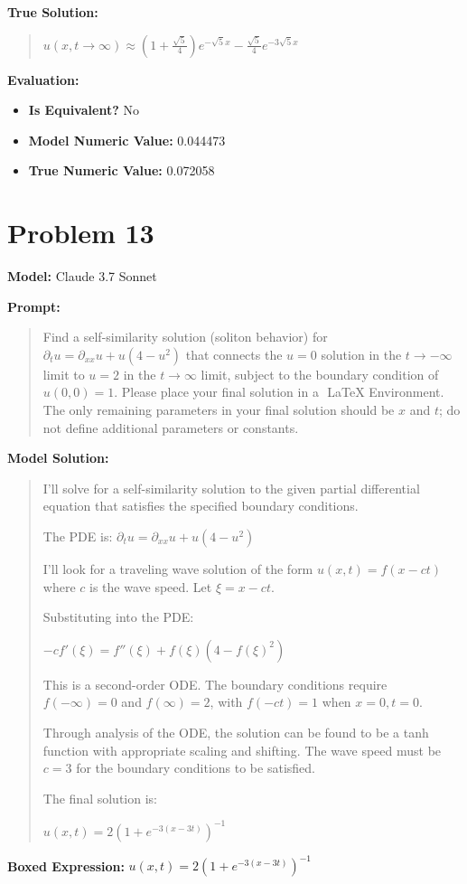 \documentclass{article}
\begin{document}
\textbf{True Solution:}
\begin{quote}
$u(x, t \rightarrow \infty) \approx \left(1 + \frac{\sqrt{5}}{4}\right) e^{-\sqrt{5}x} - \frac{\sqrt{5}}{4} e^{-3\sqrt{5}x}$
\end{quote}

\textbf{Evaluation:}
\begin{itemize}
\item \textbf{Is Equivalent?} No
\item \textbf{Model Numeric Value:} 0.044473
\item \textbf{True Numeric Value:} 0.072058
\end{itemize}
\vspace{1cm}
\section*{Problem 13}
\textbf{Model:} Claude 3.7 Sonnet

\textbf{Prompt:}
\begin{quote}
Find a self-similarity solution (soliton behavior) for $\partial_t u = \partial_{xx} u + u (4 - u^2)$ that connects the $u = 0$ solution in the $t \rightarrow -\infty$ limit to $u = 2$ in the $t \rightarrow \infty$ limit, subject to the boundary condition of $u(0, 0) = 1$. Please place your final solution in a $\boxed{}$ LaTeX Environment. The only remaining parameters in your final solution should be $x$ and $t$; do not define additional parameters or constants.
\end{quote}
\textbf{Model Solution:}
\begin{quote}
I'll solve for a self-similarity solution to the given partial differential equation that satisfies the specified boundary conditions.



The PDE is: $\partial_t u = \partial_{xx} u + u (4 - u^2)$



I'll look for a traveling wave solution of the form $u(x,t) = f(x - ct)$ where $c$ is the wave speed. Let $\xi = x - ct$.



Substituting into the PDE:

$-c f'(\xi) = f''(\xi) + f(\xi)(4 - f(\xi)^2)$



This is a second-order ODE. The boundary conditions require $f(-\infty) = 0$ and $f(\infty) = 2$, with $f(-ct) = 1$ when $x = 0, t = 0$.



Through analysis of the ODE, the solution can be found to be a tanh function with appropriate scaling and shifting. The wave speed must be $c = 3$ for the boundary conditions to be satisfied.



The final solution is:



$\boxed{u(x,t) = 2\left(1 + e^{-3(x-3t)}\right)^{-1}}$
\end{quote}
\textbf{Boxed Expression:} $u(x,t) = 2\left(1 + e^{-3(x-3t)}\right)^{-1}$
\end{document}
